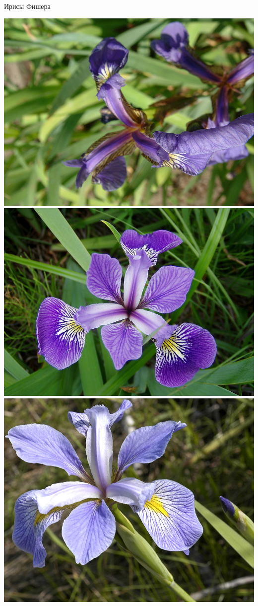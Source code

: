 \documentclass[10pt]{beamer}
\begin{document}
\begin{frame}{Ирисы Фишера}
\begin{center}
\includegraphics[scale=0.1]{images/setosa.jpg} \;
\includegraphics[scale=0.1]{images/versicolor.jpg} \;
\includegraphics[scale=0.416]{images/virginica.jpg}

\end{center}
\end{frame}
\end{document}
